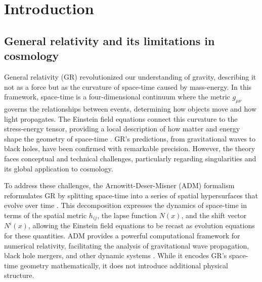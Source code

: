 \documentclass[aps,prd,reprint,superscriptaddress]{revtex4-2}
\begin{document}

\maketitle

\section{Introduction}\label{sec:intro}

\subsection{General relativity and its limitations in cosmology}

General relativity (GR) revolutionized our understanding of gravity, describing it not as a force but as the curvature of space-time caused by mass-energy. In this framework, space-time is a four-dimensional continuum where the metric $g_{\mu\nu}$ governs the relationships between events, determining how objects move and how light propagates. The Einstein field equations connect this curvature to the stress-energy tensor, providing a local description of how matter and energy shape the geometry of space-time  \cite{Einstein1915,Einstein1952}. GR's predictions, from gravitational waves to black holes, have been confirmed with remarkable precision. However, the theory faces conceptual and technical challenges, particularly regarding singularities and its global application to cosmology.

To address these challenges, the Arnowitt-Deser-Misner (ADM) formalism reformulates GR by splitting space-time into a series of spatial hypersurfaces that evolve over time \cite{Arnowitt1959, Arnowitt1962}. This decomposition expresses the dynamics of space-time in terms of the spatial metric $h_{ij}$, the lapse function $N(x)$, and the shift vector $N^i(x)$, allowing the Einstein field equations to be recast as evolution equations for these quantities. ADM provides a powerful computational framework for numerical relativity, facilitating the analysis of gravitational wave propagation, black hole mergers, and other dynamic systems \cite{Baumgarte2010}. While it encodes GR's space-time geometry mathematically, it does not introduce additional physical structure. 
\end{document}

